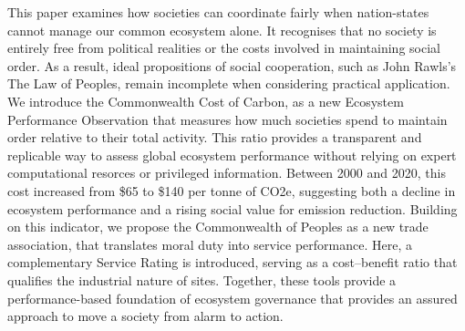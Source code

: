 This paper examines how societies can coordinate fairly when nation-states cannot manage our common ecosystem alone.
It recognises that no society is entirely free from political realities or the costs involved in maintaining social order.
As a result, ideal propositions of social cooperation, such as John Rawls’s The Law of Peoples, remain incomplete when considering practical application.
We introduce the Commonwealth Cost of Carbon, as a new Ecosystem Performance Observation that measures how much societies spend to maintain order relative to their total activity.
This ratio provides a transparent and replicable way to assess global ecosystem performance without relying on expert computational resorces or privileged information.
Between 2000 and 2020, this cost increased from \$65 to \$140 per tonne of CO2e, suggesting both a decline in ecosystem performance and a rising social value for emission reduction.
Building on this indicator, we propose the Commonwealth of Peoples as a new trade association, that translates moral duty into service performance.
Here, a complementary Service Rating is introduced, serving as a cost–benefit ratio that qualifies the industrial nature of sites.
Together, these tools provide a performance-based foundation of ecosystem governance that provides an assured approach to move a society from alarm to action.
